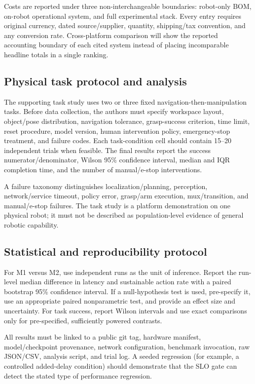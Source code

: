\documentclass[letterpaper,10pt,conference]{ieeeconf}
\begin{document}
Costs are reported under three non-interchangeable boundaries: robot-only BOM, on-robot operational system, and full experimental stack. Every entry requires original currency, dated source/supplier, quantity, shipping/tax convention, and any conversion rate. Cross-platform comparison will show the reported accounting boundary of each cited system instead of placing incomparable headline totals in a single ranking.

\subsection{Physical task protocol and analysis}

The supporting task study uses two or three fixed navigation-then-manipulation tasks. Before data collection, the authors must specify workspace layout, object/pose distribution, navigation tolerance, grasp-success criterion, time limit, reset procedure, model version, human intervention policy, emergency-stop treatment, and failure codes. Each task-condition cell should contain 15--20 independent trials when feasible. The final results report the success numerator/denominator, Wilson 95\% confidence interval, median and IQR completion time, and the number of manual/e-stop interventions.

A failure taxonomy distinguishes localization/planning, perception, network/service timeout, policy error, grasp/arm execution, mux/transition, and manual/e-stop failures. The task study is a platform demonstration on one physical robot; it must not be described as population-level evidence of general robotic capability.

\subsection{Statistical and reproducibility protocol}

For M1 versus M2, use independent runs as the unit of inference. Report the run-level median difference in latency and sustainable action rate with a paired bootstrap 95\% confidence interval. If a null-hypothesis test is used, pre-specify it, use an appropriate paired nonparametric test, and provide an effect size and uncertainty. For task success, report Wilson intervals and use exact comparisons only for pre-specified, sufficiently powered contrasts.

All results must be linked to a public git tag, hardware manifest, model/checkpoint provenance, network configuration, benchmark invocation, raw JSON/CSV, analysis script, and trial log. A seeded regression (for example, a controlled added-delay condition) should demonstrate that the SLO gate can detect the stated type of performance regression.
\end{document}
